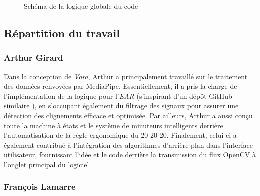 \documentclass{rapportbrebeuf}
\begin{document}
\begin{figure}[H]
{%
    }
    \caption{Schéma de la logique globale du code\protect\footnotemark}
    \label{fig:logique_code}
\end{figure}

\newpage
\subsection{Répartition du travail}

\subsubsection{Arthur Girard}

Dans la conception de \textit{Vora}, Arthur a principalement travaillé sur le traitement des données renvoyées par MediaPipe. Essentiellement, il a pris la charge de l'implémentation de la logique pour l'\textit{EAR} (s'inspirant d'un dépôt GitHub similaire \cite{github2024eyeblink}), en s'occupant également du filtrage des signaux pour assurer une détection des clignements efficace et optimisée. Par ailleurs, Arthur a aussi conçu toute la machine à états et le système de minuteurs intelligents derrière l'automatisation de la règle ergonomique du 20-20-20. Finalement, celui-ci a également contribué à l'intégration des algorithmes d'arrière-plan dans l'interface utilisateur, fournissant l'idée et le code derrière la transmission du flux OpenCV à l'onglet principal du logiciel.

\subsubsection{François Lamarre}
\end{document}
